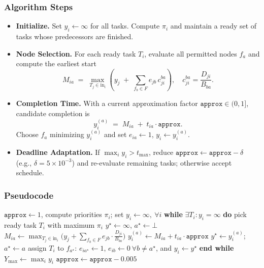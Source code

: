 \subsubsection{Algorithm Steps}

\begin{itemize}[leftmargin=*]
    \item \textbf{Initialize.} Set \(y_i\gets\infty\) for all tasks. Compute \(\pi_i\) and maintain a ready set of tasks whose predecessors are finished.
    \item \textbf{Node Selection.} For each ready task \(T_i\), evaluate all permitted nodes \(f_a\) and compute the earliest start
    \[
    M_{ia} \;=\; \max_{T_j\in \text{in}_i}\!\left( y_j \;+\; \sum_{f_b\in F} e_{jb}\,c_{ji}^{ba}\right),
    \quad c_{ji}^{ba}=\frac{D_{ji}}{B_{ba}}.
    \]
    \item \textbf{Completion Time.} With a current approximation factor \(\texttt{approx}\in(0,1]\), candidate completion is
    \[
    y_i^{(a)} \;=\; M_{ia} \;+\; t_{ia}\cdot \texttt{approx}.
    \]
    Choose \(f_a\) minimizing \(y_i^{(a)}\) and set \(e_{ia}\gets 1\), \(y_i\gets y_i^{(a)}\).
    \item \textbf{Deadline Adaptation.} If \(\max_i y_i > t_{\max}\), reduce \(\texttt{approx}\leftarrow \texttt{approx}-\delta\) (e.g., \(\delta=5\!\times\!10^{-3}\)) and re-evaluate remaining tasks; otherwise accept schedule.
\end{itemize}

\subsubsection{Pseudocode}
\begin{algorithm}[t]
\caption{Bandwidth/Data-Aware Greedy DAG Scheduler}
\label{alg:greedy_scheduler}
\begin{algorithmic}[1]
\STATE $\texttt{approx}\leftarrow 1$, compute priorities $\pi_i$; set $y_i\leftarrow\infty,\ \forall i$
\REPEAT
  \STATE \textbf{while} $\exists T_i: y_i=\infty$ \textbf{do}
    \STATE pick ready task $T_i$ with maximum $\pi_i$
    \STATE $y^\star\leftarrow\infty$, $a^\star\leftarrow\bot$
        \STATE $M_{ia}\leftarrow \max_{T_j\in \text{in}_i}\big(y_j+\sum_{f_b\in F} e_{jb}\cdot \tfrac{D_{ji}}{B_{ba}}\big)$
        \STATE $y_i^{(a)}\leftarrow M_{ia}+t_{ia}\cdot \texttt{approx}$
            \STATE $y^\star\leftarrow y_i^{(a)}$; $a^\star\leftarrow a$ 
        \ENDIF
    \ENDFOR
    \STATE assign $T_i$ to $f_{a^\star}$: $e_{ia^\star}\leftarrow 1$, $e_{ib}\leftarrow 0\ \forall b\neq a^\star$, and $y_i\leftarrow y^\star$
  \STATE \textbf{end while}
  \STATE $Y_{\max}\leftarrow \max_i y_i$
   \STATE $\texttt{approx}\leftarrow \texttt{approx}-0.005$ \ENDIF
{}
\end{algorithmic}
\end{algorithm}

